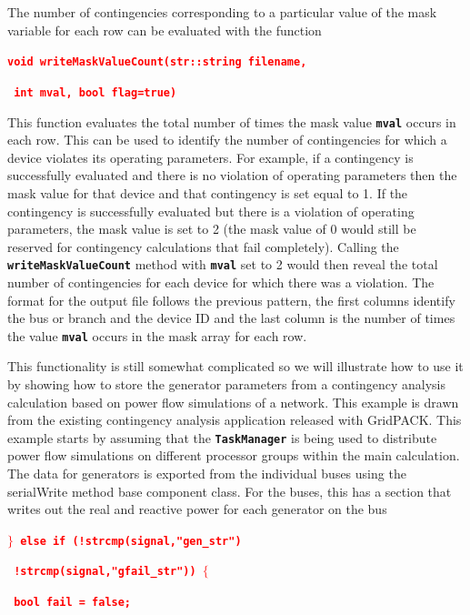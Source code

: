 \documentclass[12pt]{report} %
\begin{document}
The number of contingencies corresponding to a particular value of the mask variable for each row can be evaluated with the function

\textcolor{red}{\texttt{\textbf{void writeMaskValueCount(str::string filename,}}}

\textcolor{red}{\texttt{\textbf{                         int mval, bool flag=true)}}}

This function evaluates the total number of times the mask value \texttt{\textbf{mval}} occurs in each row. This can be used to identify the number of contingencies for which a device violates its operating parameters. For example, if a contingency is successfully evaluated and there is no violation of operating parameters then the mask value for that device and that contingency is set equal to 1. If the contingency is successfully evaluated but there is a violation of operating parameters, the mask value is set to 2 (the mask value of 0 would still be reserved for contingency calculations that fail completely). Calling the \texttt{\textbf{writeMaskValueCount}} method with \texttt{\textbf{mval}} set to 2 would then reveal the total number of contingencies for each device for which there was a violation. The format for the output file follows the previous pattern, the first columns identify the bus or branch and the device ID and the last column is the number of times the value \texttt{\textbf{mval}} occurs in the mask array for each row.

This functionality is still somewhat complicated so we will illustrate how to use it by showing how to store the generator parameters from a contingency analysis calculation based on power flow simulations of a network. This example is drawn from the existing contingency analysis application released with GridPACK. This example starts by assuming that the \texttt{\textbf{TaskManager}} is being used to distribute power flow simulations on different processor groups within the main calculation. The data for generators is exported from the individual buses using the serialWrite method base component class. For the buses, this has a section that writes out the real and reactive power for each generator on the bus

\textcolor{red}{\texttt{\textbf{$\boldsymbol{\mathrm{\}}}$ else if (!strcmp(signal,"gen\_str") {\textbar}{\textbar}}}}

\textcolor{red}{\texttt{\textbf{           !strcmp(signal,"gfail\_str")) $\boldsymbol{\mathrm{\{}}$}}}

\textcolor{red}{\texttt{\textbf{  bool fail = false;}}}
\end{document}
